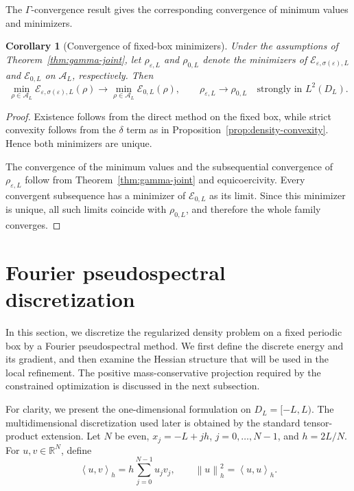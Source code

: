\documentclass[11pt]{article}
\newcommand{\R}{\mathbb{R}}
\newcommand{\A}{\mathcal{A}}
\newcommand{\E}{\mathcal{E}}
\newcommand{\eps}{\varepsilon}
\newcommand{\sig}{\sigma}
\newcommand{\inner}[2]{\left\langle #1,#2\right\rangle}
\newcommand{\norm}[1]{\left\|#1\right\|}
\theoremstyle{plain}
\newtheorem{corollary}[theorem]{Corollary}
\theoremstyle{definition}
\numberwithin{equation}{section}
\begin{document}
The $\Gamma$-convergence result gives the corresponding convergence
of minimum values and minimizers.

\begin{corollary}[Convergence of fixed-box minimizers]
\label{cor:min-conv}
Under the assumptions of Theorem~\ref{thm:gamma-joint}, let
$\rho_{\eps,L}$ and $\rho_{0,L}$ denote the minimizers of
$\E_{\eps,\sig(\eps),L}$ and $\E_{0,L}$ on $\A_L$, respectively.
Then
\begin{equation}
\label{eq:minimizer-convergence}
\min_{\rho\in\A_L}\E_{\eps,\sig(\eps),L}(\rho)
\longrightarrow
\min_{\rho\in\A_L}\E_{0,L}(\rho),
\qquad
\rho_{\eps,L}
\longrightarrow
\rho_{0,L}
\quad\text{strongly in }L^2(D_L).
\end{equation}
\end{corollary}

\begin{proof}
Existence follows from the direct method on the fixed box, while
strict convexity follows from the $\delta$ term as in
Proposition~\ref{prop:density-convexity}. Hence both minimizers are
unique.

The convergence of the minimum values and the subsequential
convergence of $\rho_{\eps,L}$ follow from
Theorem~\ref{thm:gamma-joint} and equicoercivity. Every convergent
subsequence has a minimizer of $\E_{0,L}$ as its limit. Since this
minimizer is unique, all such limits coincide with $\rho_{0,L}$,
and therefore the whole family converges.
\end{proof}
\section{Fourier pseudospectral discretization}
\label{sec:ps}

In this section, we discretize the regularized density problem on a
fixed periodic box by a Fourier pseudospectral method. We first define
the discrete energy and its gradient, and then examine the Hessian
structure that will be used in the local refinement. The positive
mass-conservative projection required by the constrained optimization
is discussed in the next subsection.

For clarity, we present the one-dimensional formulation on
$D_L=[-L,L)$. The multidimensional discretization used later is
obtained by the standard tensor-product extension. Let $N$ be even,
$x_j=-L+jh$, $j=0,\ldots,N-1$, and $h=2L/N$. For
$u,v\in\R^N$, define
\begin{equation}
\label{eq:h-inner}
\inner{u}{v}_h
=
h\sum_{j=0}^{N-1}u_jv_j,
\qquad
\norm{u}_h^2=\inner{u}{u}_h.
\end{equation}
\end{document}
